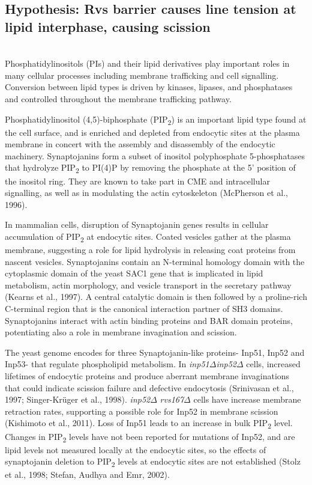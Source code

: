 \newpage
\subsection{Hypothesis: Rvs barrier causes line tension at lipid interphase, causing scission}
			\mbox{}\\
Phosphatidylinositols (PIs) and their lipid derivatives play important roles in many cellular processes including membrane trafficking and cell signalling. Conversion between lipid types is driven by kinases, lipases, and phosphatases and controlled throughout the membrane trafficking pathway. 


\vspace{5mm}
Phosphatidylinositol (4,5)-biphosphate (PIP\textsubscript{2}) is an important lipid type found at the cell surface, and is enriched and depleted from endocytic sites at the plasma membrane in concert with the assembly and disassembly of the endocytic machinery. Synaptojanins form a subset of inositol polyphosphate 5-phosphatases that hydrolyze PIP\textsubscript{2} to PI(4)P by removing the phosphate at the 5’ position of the inositol ring. They are known to take part in CME and intracellular signalling, as well as in modulating the actin cytoskeleton (McPherson et al., 1996). 


\vspace{5mm}
In mammalian cells, disruption of Synaptojanin genes results in cellular accumulation of PIP\textsubscript{2} at endocytic sites. Coated vesicles gather at the plasma membrane, suggesting a role for lipid hydrolysis in releasing coat proteins from nascent vesicles. Synaptojanins contain an N-terminal homology domain with the cytoplasmic domain of the yeast SAC1 gene that is implicated in lipid metabolism, actin morphology, and vesicle transport in the secretary pathway (Kearns et al., 1997). A central catalytic domain is then followed by a proline-rich C-terminal region that is the canonical interaction partner of SH3 domains. Synaptojanins interact with actin binding proteins and BAR domain proteins, potentiating also a role in membrane invagination and scission. 


\vspace{5mm}
The yeast genome encodes for three Synaptojanin-like proteins- Inp51, Inp52 and Inp53- that regulate phospholipid metabolism. In \textit{inp51$\Delta$}\textit{inp52$\Delta$}
 cells, increased lifetimes of endocytic proteins and produce aberrant membrane invaginations that could indicate scission failure and defective endocytosis (Srinivasan et al., 1997; Singer-Krüger et al., 1998). \textit{inp52$\Delta$} \textit{rvs167$\Delta$}
 cells have increase membrane retraction rates, supporting a possible role for Inp52 in membrane scission (Kishimoto et al., 2011). Loss of Inp51 leads to an increase in bulk PIP\textsubscript{2} level. Changes in PIP\textsubscript{2} levels have not been reported for mutations of Inp52, and are lipid levels not measured locally at the endocytic sites, so the effects of synaptojanin deletion to PIP\textsubscript{2} levels at endocytic sites are not established (Stolz et al., 1998; Stefan, Audhya and Emr, 2002).


